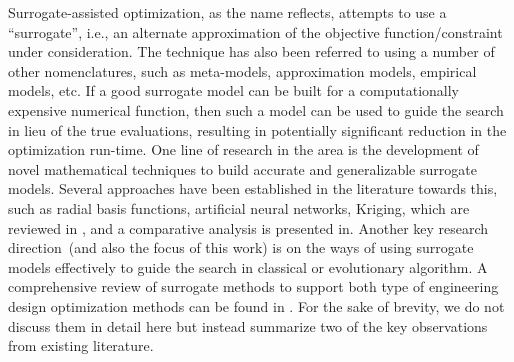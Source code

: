 \documentclass[twocolumn,10pt]{asme2ej}
\begin{document}
Surrogate-assisted optimization, as the name reflects, attempts to use a ``surrogate'', i.e., an alternate approximation of the objective function/constraint under consideration. The technique has also been referred to using a number of other nomenclatures, such as meta-models, approximation models, empirical models, etc. If a good surrogate model can be built for a computationally expensive numerical function, then such a model can be used to guide the search in lieu of the true evaluations, resulting in potentially significant reduction in the optimization run-time. {\color{blue} One line of research in the area is the development of novel mathematical techniques to build accurate and generalizable surrogate models. Several approaches have been established in the literature towards this, such as radial basis functions, artificial neural networks, Kriging, which are reviewed in \cite{KHTjin2005csf,KHTjinswarm2011}, and a comparative analysis is presented in\cite{jin2001comparative}. Another key research direction~(and also the focus of this work) is on the ways of using surrogate models effectively to guide the search in classical or evolutionary algorithm. A comprehensive review of surrogate methods to support both type of engineering design optimization methods can be found in \cite{KHTwangreview2007}}. For the sake of brevity, we do not discuss them in detail here but instead summarize two of the key observations from existing literature. 
\vspace{-0.3em}
\end{document}
